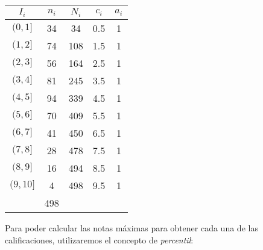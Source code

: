 \documentclass[11pt,a4paper]{article}
\theoremstyle{definition}
\begin{document}
\begin{table}[!htbp]
\hspace{1cm}
\begin{tabular}{|c|c|c|c|c|}
\multicolumn{1}{c|}{$I_i$} & $n_i$ & $N_i$ & $c_i$ & $a_i$ \\ \hline
$(0, 1]$	&	34	&	34	&	0.5	&	1 \\
$(1, 2]$	&	74	&	108	&	1.5	&	1 \\
$(2, 3]$	&	56	&	164	&	2.5	&	1 \\
$(3, 4]$	&	81	&	245	&	3.5	&	1 \\
$(4, 5]$	&	94	&	339	&	4.5	&	1 \\
$(5, 6]$	&	70	&	409	&	5.5	&	1 \\
$(6, 7]$	&	41	&	450	&	6.5	&	1 \\
$(7, 8]$	&	28	&	478	&	7.5	&	1 \\
$(8, 9]$	&	16	&	494	&	8.5	&	1 \\
$(9, 10]$	&	4	&	498	&	9.5	&	1 \\ \hline
\multicolumn{1}{c}{} & \multicolumn{1}{|c|}{498} \\ \cline{2-2}
\end{tabular}
\end{table}

Para poder calcular las notas máximas para obtener cada una de las calificaciones, utilizaremos el concepto de \emph{percentil}:
\end{document}
